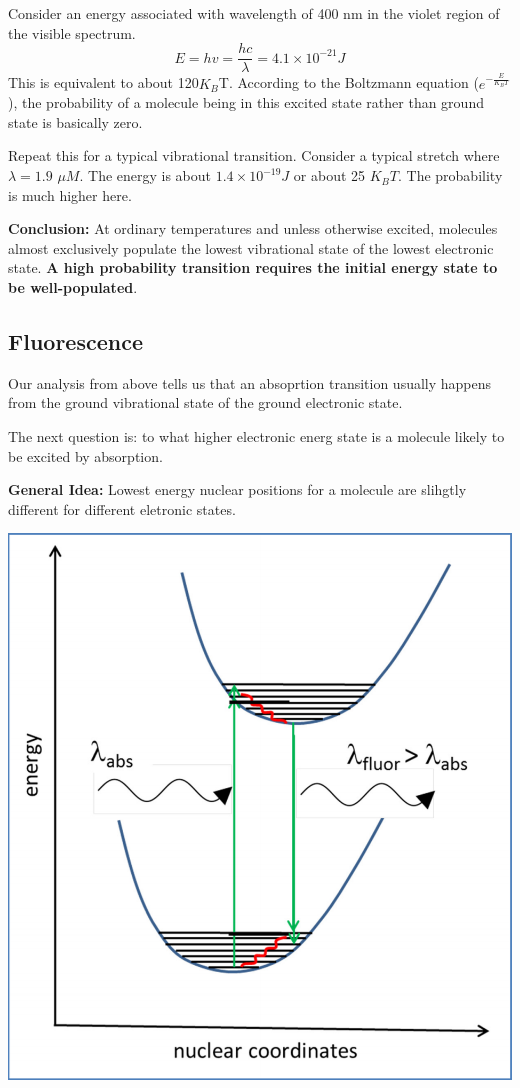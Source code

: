\documentclass[12pt, letterpaper]{article}
\begin{document}
Consider an energy associated with wavelength of 400 nm in the violet region of the visible spectrum.
\begin{equation*}
    E = hv = \frac{hc}{\lambda} = 4.1 \times 10^{-21} J 
\end{equation*}
This is equivalent to about 120$K_B$T. According to the Boltzmann equation ($e^{-\frac{E}{K_BT}}$), the probability of a molecule being in this excited state 
rather than ground state is basically zero. 

Repeat this for a typical vibrational transition. Consider a typical stretch where $\lambda = 1.9$  $\mu M.$
The energy is about \(1.4 \times 10^{-19} J \) or about 25 $K_BT$. The probability is much higher here. 

\textbf{Conclusion:} At ordinary temperatures and unless otherwise excited, molecules almost exclusively populate the lowest vibrational state of the lowest electronic state. 
\textbf{A high probability transition requires the initial energy state to be well-populated}.

\subsection*{Fluorescence}

Our analysis from above tells us that an absoprtion transition usually happens from the ground vibrational state 
of the ground electronic state. 

The next question is: to what higher electronic energ state is a molecule likely to be excited by absorption. 

\textbf{General Idea:} Lowest energy nuclear positions for a molecule are slihgtly different for different eletronic states. 
\newpage

\begin{center}
    \includegraphics[scale = 0.50]{fluorescence.png}
\end{center}
\end{document}
